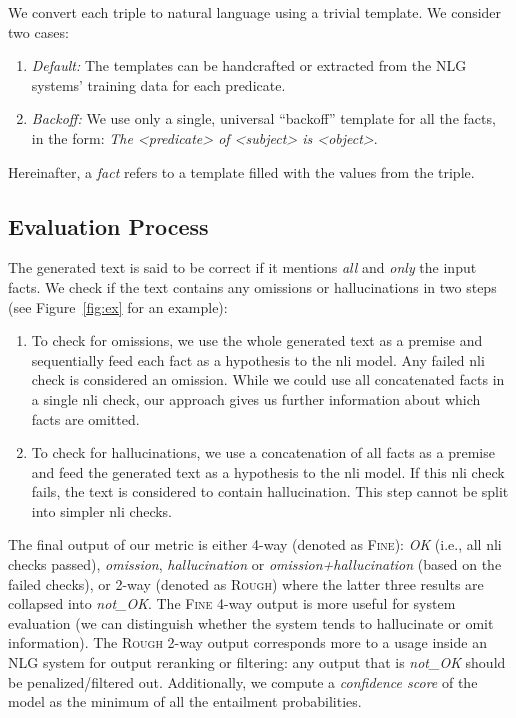 We convert each triple
to natural language using a trivial template. We consider two cases:
\begin{enumerate}[nosep,label={(\arabic*)},leftmargin=14pt,labelwidth=12pt,labelsep=2pt]
    \item \emph{Default:} The templates can be handcrafted or extracted from the NLG systems' training data for each predicate.
    \item \emph{Backoff:} We use only a single, universal ``backoff'' template for all the facts, in the form: \emph{The \textless{}predicate\textgreater{} of \textless{}subject\textgreater{} is \textless{}object\textgreater{}}.
\end{enumerate}
Hereinafter, a \textit{fact} refers to a template filled with the values from the triple.


\subsection{Evaluation Process}
\label{sec:eval-process}

The generated text is said to be correct if it mentions \textit{all} and \textit{only} the input facts.
We check if the text contains any omissions or hallucinations in two steps (see Figure~\ref{fig:ex} for an example):
\begin{enumerate}[nosep,label={(\arabic*)},leftmargin=14pt,labelwidth=12pt,labelsep=2pt]
    \item To check for omissions, we use the whole generated text as a premise and sequentially feed each fact as a hypothesis to the \ac{nli} model. Any failed \ac{nli} check is considered an omission. While we could use all concatenated facts in a single \ac{nli} check, our approach gives us further information about which facts are omitted.
    \item To check for hallucinations, we use a concatenation of all facts as a premise and feed the generated text as a hypothesis to the \ac{nli} model. If this \ac{nli} check fails, the text is considered to contain hallucination. This step cannot be split into simpler \ac{nli} checks.
\end{enumerate}
The final output of our metric is either 4-way (denoted as \textsc{Fine}): \emph{OK} (i.e., all \ac{nli} checks passed), \emph{omission}, \emph{hallucination} or \emph{omission+hallucination} (based on the failed checks), or 2-way (denoted as \textsc{Rough}) where the latter three results are collapsed into \emph{not\_OK}. The \textsc{Fine} 4-way output is more useful for system evaluation (we can distinguish whether the system tends to hallucinate or omit information). The \textsc{Rough} 2-way output corresponds more to a usage inside an NLG system for output reranking or filtering: any output that is \emph{not\_OK} should be penalized/\hspace{0mm}filtered out.
Additionally, we compute a \textit{confidence score} of the model as the minimum of all the entailment probabilities. %


